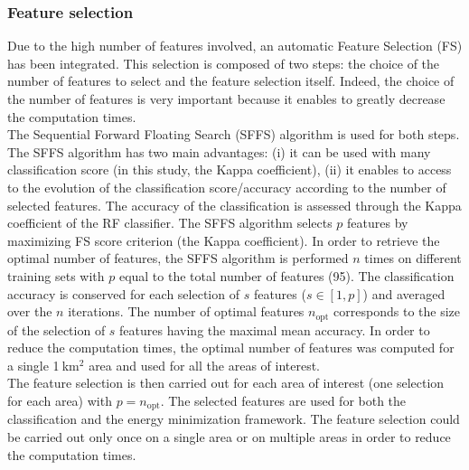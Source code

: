 \subsubsection{Feature selection}
Due to the high number of features involved, an automatic Feature Selection (FS) has been integrated. This selection is composed of two steps: the choice of the number of features to select and the feature selection itself. Indeed, the choice of the number of features is very important because it enables to greatly decrease the computation times. \\
The Sequential Forward Floating Search (SFFS) \citep{pudil1994floating} algorithm is used for both steps. The SFFS algorithm has two main advantages: (i) it can be used with many classification score (in this study, the Kappa coefficient), (ii) it enables to access to the evolution of the classification score/accuracy according to the number of selected features. The accuracy of the classification is assessed through the Kappa coefficient of the RF classifier. The SFFS algorithm selects $p$ features by maximizing FS score criterion (the Kappa coefficient). In order to retrieve the optimal number of features, the SFFS algorithm is performed $n$ times on different training sets with $p$ equal to the total number of features (95). The classification accuracy is conserved for each selection of $s$ features ($s \in [1, p]$) and averaged over the $n$ iterations. The number of optimal features $n_{\text{opt}}$ corresponds to the size of the selection of $s$ features having the maximal mean accuracy. In order to reduce the computation times, the optimal number of features was computed for a single 1$\:$km$^{2}$ area and used for all the areas of interest. \\
The feature selection is then carried out for each area of interest (one selection for each area) with $p=n_{\text{opt}}$. The selected features are used for both the classification and the energy minimization framework. The feature selection could be carried out only once on a single area or on multiple areas in order to reduce the computation times.

